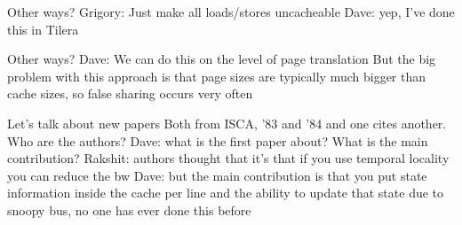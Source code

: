 Other ways?
Grigory: Just make all loads/stores uncacheable
Dave: yep, I’ve done this in Tilera

Other ways?
Dave: We can do this on the level of page translation
But the big problem with this approach is that page sizes are typically much bigger than cache sizes, so false sharing occurs very often

Let’s talk about new papers
Both from ISCA, ’83 and ’84 and one cites another. Who are the authors?
Dave: what is the first paper about? What is the main contribution?
Rakshit: authors thought that it’s that if you use temporal locality you can reduce the bw
Dave: but the main contribution is that you put state information inside the cache per line and the ability to update that state due to snoopy bus, no one has ever done this before



